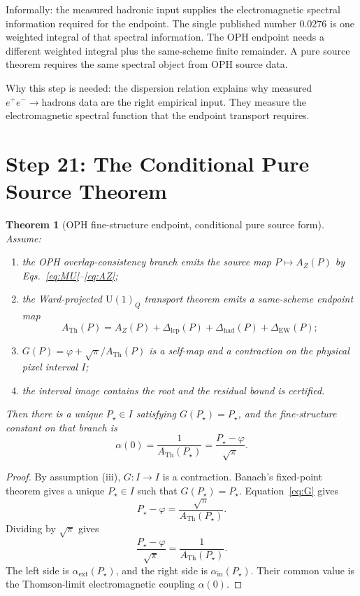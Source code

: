 \documentclass[11pt]{article}
\newtheorem{theorem}{Theorem}
\theoremstyle{remark}
\newcommand{\U}{\mathrm{U}}
\newcommand{\ATh}{A_{\mathrm{Th}}}
\newcommand{\AZ}{A_Z}
\newcommand{\Dlep}{\Delta_{\mathrm{lep}}}
\newcommand{\Dhad}{\Delta_{\mathrm{had}}}
\newcommand{\DEW}{\Delta_{\mathrm{EW}}}
\begin{document}
Informally: the measured hadronic input supplies the electromagnetic spectral information required for the endpoint. The single published number \(0.0276\) is one weighted integral of that spectral information. The OPH endpoint needs a different weighted integral plus the same-scheme finite remainder. A pure source theorem requires the same spectral object from OPH source data.

Why this step is needed: the dispersion relation explains why measured \(e^+e^-\to\mathrm{hadrons}\) data are the right empirical input. They measure the electromagnetic spectral function that the endpoint transport requires.

\section{Step 21: The Conditional Pure Source Theorem}

\begin{theorem}[OPH fine-structure endpoint, conditional pure source form]
Assume:
\begin{enumerate}[label=(\roman*)]
\item the OPH overlap-consistency branch emits the source map \(P\mapsto \AZ(P)\) by Eqs.~\eqref{eq:MU}--\eqref{eq:AZ};
\item the Ward-projected \(\U(1)_Q\) transport theorem emits a same-scheme endpoint map
\[
\ATh(P)=\AZ(P)+\Dlep(P)+\Dhad(P)+\DEW(P);
\]
\item \(G(P)=\varphi+\sqrt\pi/\ATh(P)\) is a self-map and a contraction on the physical pixel interval \(I\);
\item the interval image contains the root and the residual bound is certified.
\end{enumerate}
Then there is a unique \(P_\star\in I\) satisfying \(G(P_\star)=P_\star\), and the fine-structure constant on that branch is
\[
\alpha(0)=\frac{1}{\ATh(P_\star)}=\frac{P_\star-\varphi}{\sqrt\pi}.
\]
\end{theorem}

\begin{proof}
By assumption (iii), \(G:I\to I\) is a contraction. Banach's fixed-point theorem gives a unique \(P_\star\in I\) such that \(G(P_\star)=P_\star\). Equation~\eqref{eq:G} gives
\[
P_\star-\varphi=\frac{\sqrt\pi}{\ATh(P_\star)}.
\]
Dividing by \(\sqrt\pi\) gives
\[
\frac{P_\star-\varphi}{\sqrt\pi}=\frac{1}{\ATh(P_\star)}.
\]
The left side is \(\alpha_{\mathrm{ext}}(P_\star)\), and the right side is \(\alpha_{\mathrm{in}}(P_\star)\). Their common value is the Thomson-limit electromagnetic coupling \(\alpha(0)\).
\end{proof}
\end{document}
